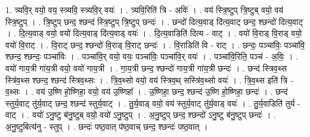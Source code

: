 \documentclass[17pt]{extarticle}
\begin{document}
1. त्र्यवि॒र् वयो॒ वय॒ स्त्र्यवि॒ स्त्र्यवि॒र् वयः॑ । . त्र्यवि॒रिति॑ त्रि - अविः॑ । . वय॑ स्त्रि॒ष्टुप् त्रि॒ष्टुब् वयो॒ वय॑ स्त्रि॒ष्टुप् । . त्रि॒ष्टुप् छन्द॒ श्छन्द॑ स्त्रि॒ष्टुप् त्रि॒ष्टुप् छन्दः॑ । . छन्दो॑ दित्य॒वाड् दि॑त्य॒वाट् छन्द॒ श्छन्दो॑ दित्य॒वाट् । . दि॒त्य॒वाड् वयो॒ वयो॑ दित्य॒वाड् दि॑त्य॒वाड् वयः॑ । . दि॒त्य॒वाडिति॑ दित्य - वाट् । . वयो॑ वि॒राड् वि॒राड् वयो॒ वयो॑ वि॒राट् । . वि॒राट् छन्द॒ श्छन्दो॑ वि॒राड् वि॒राट् छन्दः॑ । . वि॒राडिति॑ वि - राट् । . छन्दः॒ पञ्चा॑विः॒ पञ्चा॑वि॒ श्छन्द॒ श्छन्दः॒ पञ्चा॑विः । . पञ्चा॑वि॒र् वयो॒ वयः॒ पञ्चा॑विः॒ पञ्चा॑वि॒र् वयः॑ । . पञ्चा॑वि॒रिति॒ पञ्च॑ - अ॒विः॒ । . वयो॑ गाय॒त्री गा॑य॒त्री वयो॒ वयो॑ गाय॒त्री । . गा॒य॒त्री छन्द॒ श्छन्दो॑ गाय॒त्री गा॑य॒त्री छन्दः॑ । . छन्द॑ स्त्रिव॒थ्स स्त्रि॑व॒थ्स श्छन्द॒ श्छन्द॑ स्त्रिव॒थ्सः । . त्रि॒व॒थ्सो वयो॒ वय॑ स्त्रिव॒थ् सस्त्रि॑व॒थ्सो वयः॑ । . त्रि॒व॒थ्स इति॑ त्रि - व॒थ्सः । . वय॑ उ॒ष्णि हो॒ष्णिहा॒ वयो॒ वय॑ उ॒ष्णिहा᳚ । . उ॒ष्णिहा॒ छन्द॒ श्छन्द॑ उ॒ष्णि हो॒ष्णिहा॒ छन्दः॑ । . छन्द॑ स्तुर्य॒वाट् तु॑र्य॒वाट् छन्द॒ श्छन्द॑ स्तुर्य॒वाट् । . तु॒र्य॒वाड् वयो॒ वय॑ स्तुर्य॒वाट् तु॑र्य॒वाड् वयः॑ । . तु॒र्य॒वाडिति॑ तुर्य - वाट् । . वयो॑ ऽनु॒ष्टु ब॑नु॒ष्टुब् वयो॒ वयो॑ ऽनु॒ष्टुप् । . अ॒नु॒ष्टुप् छन्द॒ श्छन्दो॑ ऽनु॒ष्टु ब॑नु॒ष्टुप् छन्दः॑ । . अ॒नु॒ष्टुबित्य॑नु - स्तुप् । . छन्दः॑ पष्ठ॒वात् प॑ष्ठ॒वाच् छन्द॒ श्छन्दः॑ पष्ठ॒वात् । \newline
\end{document}
